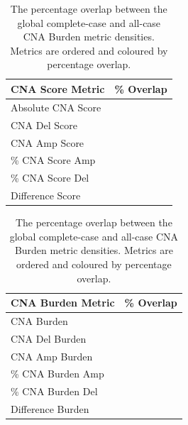 \begin{table}[h]
    \begin{minipage}{.49\linewidth}
    \caption[The percentage overlap between the global complete-case and all-case CNA Score metric densities]{
    The percentage overlap between the global complete-case and all-case CNA Score metric densities.
    Metrics are ordered and coloured by percentage overlap.}
      \centering 
\begin{tabular}[t]{l>{}r}
\toprule
CNA Score Metric & \% Overlap\\
\midrule
Absolute CNA Score & \cellcolor[HTML]{414487}{\textcolor{white}{96.55}}\\
 
CNA Del Score & \cellcolor[HTML]{482374}{\textcolor{white}{97.15}}\\
 
CNA Amp Score & \cellcolor[HTML]{481769}{\textcolor{white}{97.35}}\\
 
\% CNA Score Amp & \cellcolor[HTML]{46085B}{\textcolor{white}{97.58}}\\
 
\% CNA Score Del & \cellcolor[HTML]{440154}{\textcolor{white}{97.69}}\\
 
Difference Score & \cellcolor[HTML]{440154}{\textcolor{white}{97.69}}\\
\bottomrule
\end{tabular} \label{table:CNAScoreT1}
    \end{minipage}%
    \hspace{0.4cm}
    \begin{minipage}{.49\linewidth}
      \centering
    \caption[The percentage overlap between the global complete-case and all-case CNA Burden metric densities.]{
    The percentage overlap between the global complete-case and all-case CNA Burden metric densities.
    Metrics are ordered and coloured by percentage overlap.} 
\begin{tabular}[t]{l>{}r}
\toprule
CNA Burden Metric & \% Overlap\\
\midrule
CNA Burden & \cellcolor[HTML]{414487}{\textcolor{white}{96.76}}\\
 
CNA Del Burden & \cellcolor[HTML]{472D7B}{\textcolor{white}{97.18}}\\
 
CNA Amp Burden & \cellcolor[HTML]{482979}{\textcolor{white}{97.24}}\\
 
\% CNA Burden Amp & \cellcolor[HTML]{481C6E}{\textcolor{white}{97.45}}\\
 
\% CNA Burden Del & \cellcolor[HTML]{481C6E}{\textcolor{white}{97.45}}\\
 
Difference Burden & \cellcolor[HTML]{440154}{\textcolor{white}{97.87}}\\
\bottomrule
\end{tabular} \label{table:CNABurdenT1}
    \end{minipage}
\end{table}
\clearpage

